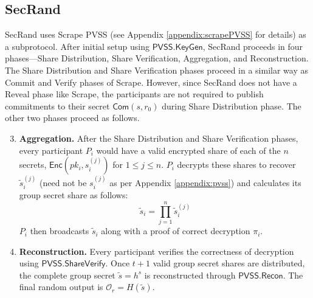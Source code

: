 \documentclass[letterpaper,twocolumn,10pt]{article}
\theoremstyle{definition}
\theoremstyle{remark}
\begin{document}
\subsection{SecRand}
\label{appendix:secRand}
SecRand uses Scrape PVSS (see Appendix \ref{appendix:scrapePVSS} for details) as a subprotocol. After initial setup using $\mathsf{PVSS.KeyGen}$, SecRand proceeds in four phases---Share Distribution, Share Verification, Aggregation, and Reconstruction. The Share Distribution and Share Verification phases proceed in a similar way as Commit and Verify phases of Scrape. However, since SecRand does not have a Reveal phase like Scrape, the participants are not required to publish commitments to their secret $\mathsf{Com}(s, r_0)$ during Share Distribution phase. The other two phases proceed as follows.

\begin{enumerate}
    \setcounter{enumi}{2}
    \item \textbf{Aggregation.} After the Share Distribution and Share Verification phases, every participant $P_i$ would have a valid encrypted share of each of the $n$ secrets, $\mathsf{Enc}(pk_i, s_i^{(j)})$ for $1 \le j \le n$. $P_i$ decrypts these shares to recover $\tilde{s}_i^{(j)}$ (need not be $s_i^{(j)}$ as per Appendix \ref{appendix:pvss}) and calculates its group secret share as follows: 
    $$\tilde{s}_i = \prod_{j=1}^{n}\tilde{s}_i^{(j)}$$
    $P_i$ then broadcasts $\tilde{s}_i$ along with a proof of correct decryption $\pi_i$.
    \item \textbf{Reconstruction.} Every participant verifies the correctness of decryption using $\mathsf{PVSS.ShareVerify}$. Once $t + 1$ valid group secret shares are distributed, the complete group secret $\tilde{s} = h^s$ is reconstructed through $\mathsf{PVSS.Recon}$. The final random output is $\mathcal{O}_r = H(\tilde{s})$.
\end{enumerate}
\end{document}
